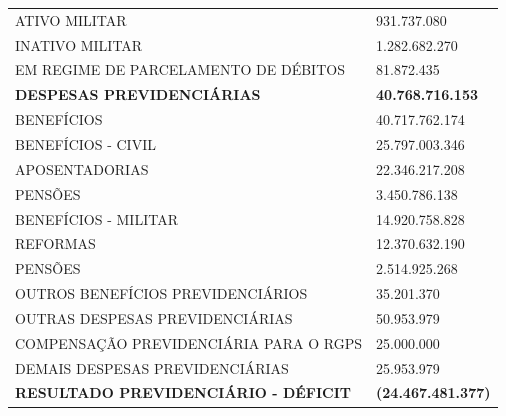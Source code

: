 \documentclass{article}
\begin{document}
\begin{longtable}[c]{m{12cm}m{3cm}}
\multicolumn{1}{L{12cm}}{\hspace{8em} ATIVO MILITAR} & \multicolumn{1}{R{3cm}}{931.737.080} \\
\multicolumn{1}{L{12cm}}{\hspace{8em} INATIVO MILITAR} & \multicolumn{1}{R{3cm}}{1.282.682.270} \\
\multicolumn{1}{L{12cm}}{\hspace{6em} EM REGIME DE PARCELAMENTO DE DÉBITOS} & \multicolumn{1}{R{3cm}}{81.872.435} \\
\hline\hline
\multicolumn{1}{L{12cm}}{\hspace{0em} \textbf{ DESPESAS PREVIDENCIÁRIAS }} & \multicolumn{1}{R{3cm}}{\textbf{ 40.768.716.153 }} \\
\multicolumn{1}{L{12cm}}{\hspace{2em} BENEFÍCIOS} & \multicolumn{1}{R{3cm}}{40.717.762.174} \\
\multicolumn{1}{L{12cm}}{\hspace{4em} BENEFÍCIOS -  CIVIL} & \multicolumn{1}{R{3cm}}{25.797.003.346} \\
\multicolumn{1}{L{12cm}}{\hspace{6em} APOSENTADORIAS} & \multicolumn{1}{R{3cm}}{22.346.217.208} \\
\multicolumn{1}{L{12cm}}{\hspace{6em} PENSÕES} & \multicolumn{1}{R{3cm}}{3.450.786.138} \\
\multicolumn{1}{L{12cm}}{\hspace{4em} BENEFÍCIOS - MILITAR} & \multicolumn{1}{R{3cm}}{14.920.758.828} \\
\multicolumn{1}{L{12cm}}{\hspace{6em} REFORMAS} & \multicolumn{1}{R{3cm}}{12.370.632.190} \\
\multicolumn{1}{L{12cm}}{\hspace{6em} PENSÕES} & \multicolumn{1}{R{3cm}}{2.514.925.268} \\
\multicolumn{1}{L{12cm}}{\hspace{6em} OUTROS BENEFÍCIOS PREVIDENCIÁRIOS} & \multicolumn{1}{R{3cm}}{35.201.370} \\
\multicolumn{1}{L{12cm}}{\hspace{2em} OUTRAS DESPESAS PREVIDENCIÁRIAS} & \multicolumn{1}{R{3cm}}{50.953.979} \\
\multicolumn{1}{L{12cm}}{\hspace{4em} COMPENSAÇÃO PREVIDENCIÁRIA PARA O RGPS} & \multicolumn{1}{R{3cm}}{25.000.000} \\
\multicolumn{1}{L{12cm}}{\hspace{4em} DEMAIS DESPESAS PREVIDENCIÁRIAS} & \multicolumn{1}{R{3cm}}{25.953.979} \\
\hline\hline
\multicolumn{1}{L{12cm}}{\hspace{0em} \textbf{ RESULTADO PREVIDENCIÁRIO - DÉFICIT }} & \multicolumn{1}{R{3cm}}{\textbf{ (24.467.481.377) }} \\\hline\hline\end{longtable}\raggedright\fontsize{7pt}{10pt}\selectfont {Fonte: PPO.} \\\fontsize{7pt}{10pt}\selectfont {ELABORAÇÃO: DCAF/SCPPO/SEPLAG}\\
\end{document}
